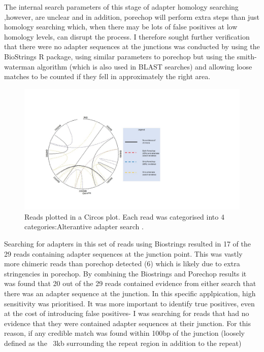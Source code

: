 The  internal search parameters of this stage of adapter homology searching ,however, are unclear and  in addition, porechop will perform extra steps than just homology searching which, when there may be lots of false positives at low homology levels, can disrupt the process. I therefore sought further verification that there were no adapter sequences at the junctions was conducted by using the BioStrings R package, using similar parameters to porechop but using the smith-waterman algorithm (which is also used in BLAST searches) and allowing loose matches to be counted if they fell in approximately the right area.

\begin{figure}[h!]
\centering
\includegraphics[width=\textwidth{}]{Chapter_2/baskey.jpg}
\caption{ Reads plotted in a Circos plot. Each read was categorised into 4 categories:Alterantive adapter search .}
\label{fig:Heatmap}
\end{figure}

Searching for adapters in this set of reads using Biostrings resulted in 17 of the 29 reads containing adapter sequences at the junction point. This was vastly more chimeric reads than porechop detected (6) which is likely due to extra stringencies in porechop. By combining the Biostrings and Porechop results it was found that 20 out of the 29 reads contained evidence from either search that there was an adapter sequence at the junction. In this specific applpication, high sensitivity was prioritised. It was more important to identify true positives, even at the cost of introducing false positives- I was searching for reads that had no evidence that they were contained adapter sequences at their junction. For this reason, if any credible match was found within 100bp of the junction (loosely defined as the ~3kb surrounding the repeat region in addition to the repeat)

